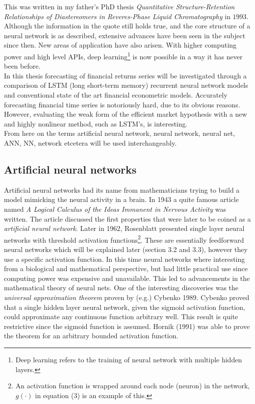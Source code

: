 \documentclass[12pt, letterpaper]{amsart}%
\begin{document}
This was written in my father's PhD thesis \textit{Quantitative Structure-Retention Relationships of Diastereomers in Reveres-Phase Liquid Chromatography} in $1993$. Although the information in the quote still holds true, and the core structure of a neural network is as described, extensive advances have been seen in the subject since then. New areas of application have also arisen. With higher computing power and high level APIs, deep learning\footnote{Deep learning refers to the training of neural network with multiple hidden layers.} is now possible in a way it has never been before.
\\

In this thesis forecasting of financial returns series will be investigated through a comparison of LSTM (long short-term memory) recurrent neural network models and conventional state of the art financial econometric models. Accurately forecasting financial time series is notoriously hard, due to its obvious reasons. However, evaluating the weak form of the efficient market hypothesis with a new and highly nonlinear method, such as LSTM's, is interesting.
\\

From here on the terms artificial neural network, neural network, neural net, ANN, NN, network etcetera will be used interchangeably.

\subsection{Artificial neural networks}
Artificial neural networks had its name from mathematicians trying to build a model mimicking the neural activity in a brain. In 1943 a quite famous article named \textit{A Logical Calculus of the Ideas Immanent in Nervous Activity} was written. The article discussed the first properties that were later to be coined as a \textit{artificial neural network}. Later in 1962, Rosenblatt presented single layer neural networks with threshold activation functions\footnote{An activation function is wrapped around each node (neuron) in the network, $g(\cdot)$ in equation (3) is an example of this.}. These are essentially feedforward neural networks which will be explained later (section 3.2 and 3.3), however they use a specific activation function. In this time neural networks where interesting from a biological and mathematical perspective, but had little practical use since computing power was expensive and unavailable. This led to advancements in the mathematical theory of neural nets. One of the interesting discoveries was the \textit{universal approximation theorem} proven by (e.g.) Cybenko 1989. Cybenko proved that a single hidden layer neural network, given the sigmoid activation function, could approximate any continuous function arbitrary well. This result is quite restrictive since the sigmoid function is assumed. Hornik (1991) was able to prove the theorem for an arbitrary bounded activation function.
\\
\end{document}
